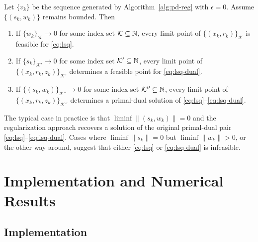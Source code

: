 \documentclass{amsart}
\begin{document}
\begin{btheorem}
  \label{thm:limit-points}
  Let $\{v_k\}$ be the sequence generated by Algorithm~\ref{alg:pd-reg} with
  $\epsilon = 0$. Assume $\{(s_k, w_k)\}$ remains bounded. Then
  \begin{enumerate}
    \item If $\{w_k\}_{\mathcal{K}} \to 0$ for some index set $\mathcal{K}
      \subseteq \mathbb{N}$, every limit point of $\{(x_k,r_k)\}_{\mathcal{K}}$ is
      feasible for \eqref{eq:lsq}.
    \item If $\{s_k\}_{\mathcal{K}'} \to 0$ for some index set $\mathcal{K}'
      \subseteq \mathbb{N}$, every limit point of $\{(x_k,r_k,z_k)\}_{\mathcal{K}'}$
      determines a feasible point for \eqref{eq:lsq-dual}.
    \item If $\{(s_k,w_k)\}_{\mathcal{K}''} \to 0$ for some index set
      $\mathcal{K}'' \subseteq \mathbb{N}$, every limit point of
      $\{(x_k,r_k,z_k)\}_{\mathcal{K}''}$ determines a primal-dual solution of
      \eqref{eq:lsq}--\eqref{eq:lsq-dual}.
  \end{enumerate}
\end{btheorem}

The typical case in practice is that $\liminf \|(s_k,w_k)\| = 0$ and the
regularization approach recovers a solution of the original primal-dual pair
\eqref{eq:lsq}--\eqref{eq:lsq-dual}. Cases where $\liminf \|s_k\| = 0$ but
$\liminf \|w_k\| > 0$, or the other way around, suggest that either \eqref{eq:lsq}
or \eqref{eq:lsq-dual} is infeasible.

\section{Implementation and Numerical Results}
\label{sec:implementation}


\subsection{Implementation}
\end{document}
